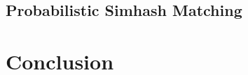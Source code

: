 \documentclass[12pt,a4paper]{scrartcl}
\begin{document}

\subsection{Probabilistic Simhash Matching}

\section{Conclusion}

\printbibliography
\end{document}
